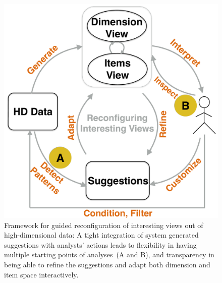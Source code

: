 \begin{figure}[t]
\centering
\includegraphics[width=0.8\columnwidth]{figs/seekaview/workflow}
\caption{Framework for guided reconfiguration of interesting views out of high-dimensional data: A tight integration of system generated suggestions with analysts' actions leads to flexibility in having multiple starting points of analyses~(A and B), and transparency in being able to refine the suggestions and adapt both dimension and item space interactively.
}
\label{figs:seekaview_workflow}
\end{figure}
